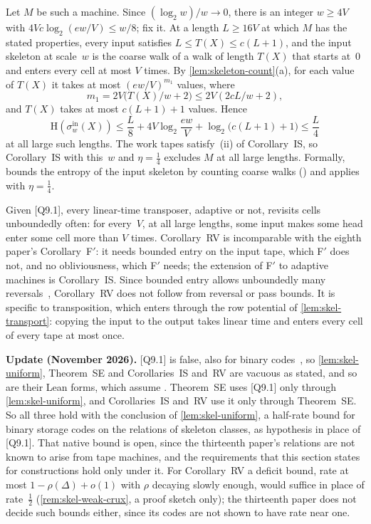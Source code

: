 \begin{outline}
Let $M$ be such a machine. Since $(\log_2w)/w\to0$, there is an integer $w\ge4V$ with $4Vc\log_2(ew/V)\le w/8$; fix it.
At a length $L\ge16V$ at which $M$ has the stated properties, every input satisfies $L\le T(X)\le c(L+1)$, and the input
skeleton at scale~$w$ is the coarse walk of a walk of length $T(X)$ that starts at~$0$ and enters every cell at most $V$
times. By \cref{lem:skeleton-count}(a), for each value of $T(X)$ it takes at most $(ew/V)^{m_1}$ values, where
\[
  m_1=2V\bigl(T(X)/w+2\bigr)\le2V(2cL/w+2),
\]
and $T(X)$ takes at most $c(L+1)+1$ values. Hence
\[
  \mathrm H(\sigma^{\mathrm{in}}_w(X))\le\frac L8+4V\log_2\frac{ew}V+\log_2\bigl(c(L+1)+1\bigr)\le\frac L4
\]
at all large such lengths. The work tapes satisfy~(ii) of Corollary~IS, so Corollary~IS with this~$w$ and $\eta=\frac14$
excludes $M$ at all large lengths.
Formally,  bounds the entropy of the input skeleton by counting coarse walks
() and applies  with $\eta=\frac14$.
\end{outline}

Given [Q9.1], every linear-time transposer, adaptive or not, revisits cells unboundedly often: for every~$V$, at all
large lengths, some input makes some head enter some cell more than $V$ times. Corollary~RV is incomparable with the
eighth paper's Corollary~F$'$: it needs bounded entry on the input tape, which F$'$ does not, and no obliviousness,
which F$'$ needs; the extension of F$'$ to adaptive machines is Corollary~IS. Since bounded entry allows unboundedly
many reversals~\cite[Remark~6.2]{BoundedNesting2026}, Corollary~RV does not follow from reversal or pass bounds. It is
specific to transposition, which enters through the row potential of \cref{lem:skel-transport}: copying the input to the
output takes linear time and enters every cell of every tape at most once.

\textbf{Update (November 2026).} [Q9.1] is false, also for binary
codes~\cite[Theorem~A and Corollary~A$'$]{StorageCodes2026}, so \cref{lem:skel-uniform}, Theorem~SE and Corollaries~IS
and~RV are vacuous as stated, and so are their Lean forms, which assume . Theorem~SE uses
[Q9.1] only through \cref{lem:skel-uniform}, and Corollaries~IS and~RV use it only through Theorem~SE. So all three hold
with the conclusion of \cref{lem:skel-uniform}, a half-rate bound for binary storage codes on the relations of skeleton
classes, as hypothesis in place of [Q9.1]. That native bound is open, since the thirteenth paper's relations are not
known to arise from tape machines, and the requirements that this section states for constructions hold only under it.
For Corollary~RV a deficit bound, rate at most $1-\rho(\Delta)+o(1)$ with $\rho$ decaying slowly enough, would suffice in
place of rate~$\frac12$ (\cref{rem:skel-weak-crux}, a proof sketch only); the thirteenth paper does not decide such
bounds either, since its codes are not shown to have rate near one.

